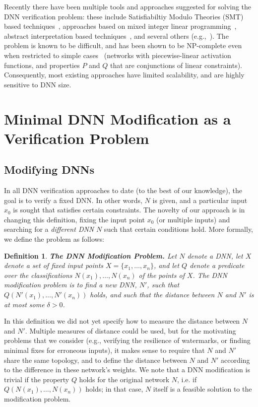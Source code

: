 \documentclass{easychair}
\newtheorem{definition}{Definition}
\begin{document}
Recently there have been multiple tools and approaches suggested for
solving the DNN verification problem: these include Satisfiabiltiy
Modulo Theories (SMT) based
techniques~\cite{KaBaDiJuKo17Reluplex,KaHuIbJuLaLiShThWuZeDiKoBa19Marabou},
approaches based on mixed integer linear
programming~\cite{Ehlers2017,TjXiTe19}, abstract interpretation based
techniques~\cite{GeMiDrTsChVe18}, and several others
(e.g.,~\cite{HuKwWaWu17,NaKaRySaWa17}). The problem is known to be
difficult, and has been shown to be NP-complete even when restricted
to simple cases~\cite{KaBaDiJuKo17Reluplex} (networks with
piecewise-linear activation functions, and properties $P$ and $Q$ that
are conjunctions of linear constraints). Consequently, most existing approaches
have limited scalability, and are highly sensitive to DNN size.


\section{Minimal DNN Modification as a Verification Problem}
\label{sec:verifyWatermarks}

\subsection{Modifying DNNs}

In all DNN verification approaches to date (to the best of our
knowledge), the goal is to verify a fixed DNN. In other words, $N$ is
given, and a particular input $x_0$ is sought that satisfies certain constraints.
The novelty of our approach is in changing this definition, fixing
the input point $x_0$ (or multiple inputs) and searching for a
\emph{different DNN} $N$ such that certain conditions hold.
More formally, we define the problem as follows:

\begin{definition}\textbf{The DNN Modification Problem.}
  Let $N$ denote a DNN, let $X$ denote a set of fixed input points
  $X=\{x_1, \ldots, x_n\}$, and let $Q$ denote a predicate over the
  classifications $N(x_1),\ldots,N(x_n)$ of the points of $X$. The
  \emph{DNN modification problem} is to find a new DNN, $N'$, such that
  $Q(N'(x_1),\ldots,N'(x_n))$ holds, and such that the distance
  between $N$ and $N'$ is at most some $\delta>0$.
\end{definition}

In this definition we did not yet specify how to measure the distance
between $N$ and $N'$. Multiple measures of distance could be used, but for the
motivating problems that we consider (e.g., verifying the resilience
of watermarks, or finding minimal fixes for erroneous inputs), it
makes sense to require that $N$ and $N'$ share the same topology, and
to define the distance between $N$ and $N'$ according to the
difference in these network's weights. We note that a DNN modification
is trivial if the property $Q$ holds for the original network $N$,
i.e. if $Q(N(x_1),\ldots,N(x_n))$ holds; in that case, $N$ itself is a
feasible solution to the modification problem.
\end{document}
